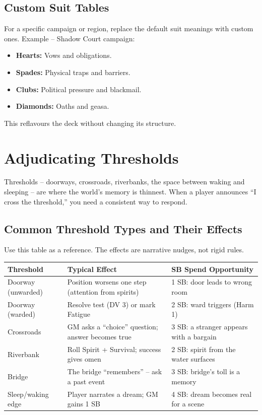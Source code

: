 \subsection*{Custom Suit Tables}
For a specific campaign or region, replace the default suit meanings with custom ones. Example – Shadow Court campaign:
\begin{itemize}
  \item \textbf{Hearts:} Vows and obligations.
  \item \textbf{Spades:} Physical traps and barriers.
  \item \textbf{Clubs:} Political pressure and blackmail.
  \item \textbf{Diamonds:} Oaths and geasa.
\end{itemize}
This reflavours the deck without changing its structure.

\section{Adjudicating Thresholds}
\label{sec:thresholds-advanced}

Thresholds – doorways, crossroads, riverbanks, the space between waking and sleeping – are where the world’s memory is thinnest. When a player announces “I cross the threshold,” you need a consistent way to respond.

\subsection*{Common Threshold Types and Their Effects}
Use this table as a reference. The effects are narrative nudges, not rigid rules.

\begin{center}
\small
\begin{tabular}{lll}
\toprule
\textbf{Threshold} & \textbf{Typical Effect} & \textbf{SB Spend Opportunity} \\
\midrule
Doorway (unwarded) & Position worsens one step (attention from spirits) & 1 SB: door leads to wrong room \\
Doorway (warded) & Resolve test (DV 3) or mark Fatigue & 2 SB: ward triggers (Harm 1) \\
Crossroads & GM asks a “choice” question; answer becomes true & 3 SB: a stranger appears with a bargain \\
Riverbank & Roll Spirit + Survival; success gives omen & 2 SB: spirit from the water surfaces \\
Bridge & The bridge “remembers” – ask a past event & 3 SB: bridge’s toll is a memory \\
Sleep/waking edge & Player narrates a dream; GM gains 1 SB & 4 SB: dream becomes real for a scene \\
\bottomrule
\end{tabular}
\end{center}

